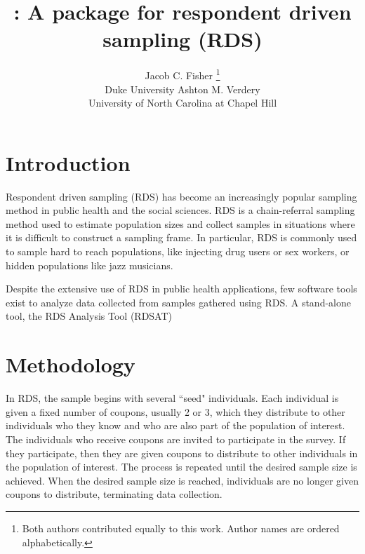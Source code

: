 \documentclass[article]{jss}
\author{Jacob C. Fisher
        \thanks{Both authors contributed equally to this work.  Author names are ordered alphabetically.}
	       \\Duke University \And 
        Ashton M. Verdery\\University of North Carolina at Chapel Hill
								}
\title{\pkg{RDS2}: A \proglang{Stata} package for respondent driven sampling (RDS)}
\begin{document}

\section[Introduction]{Introduction}
Respondent driven sampling (RDS) has become an increasingly popular sampling method in public health and the social sciences. RDS is a chain-referral sampling method used to estimate population sizes and collect samples in situations where it is difficult to construct a sampling frame.  In particular, RDS is commonly used to sample hard to reach populations, like injecting drug users or sex workers, or hidden populations like jazz musicians.

Despite the extensive use of RDS in public health applications, few software tools exist to analyze data collected from samples gathered using RDS.  A stand-alone tool, the RDS Analysis Tool (RDSAT) \citeyear{rdsat}

\section[Methodology]{Methodology}
In RDS, the sample begins with several ``seed" individuals.  Each individual is given a fixed number of coupons, usually 2 or 3, which they distribute to other individuals who they know and who are also part of the population of interest.  The individuals who receive coupons are invited to participate in the survey.  If they participate, then they are given coupons to distribute to other individuals in the population of interest.  The process is repeated until the desired sample size is achieved.  When the desired sample size is reached, individuals are no longer given coupons to distribute, terminating data collection.   




\end{document}

